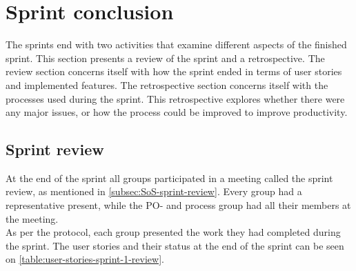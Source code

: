 \section{Sprint conclusion}
The sprints end with two activities that examine different aspects of the finished sprint.
This section presents a review of the sprint and a retrospective.
The review section concerns itself with how the sprint ended in terms of user stories and implemented features.
The retrospective section concerns itself with the processes used during the sprint.
This retrospective explores whether there were any major issues, or how the process could be improved to improve productivity.

\subsection{Sprint review}
At the end of the sprint all groups participated in a meeting called the sprint review, as mentioned in \autoref{subsec:SoS-sprint-review}.
Every group had a representative present, while the PO- and process group had all their members at the meeting.
\\
As per the protocol, each group presented the work they had completed during the sprint. The user stories and their status at the end of the sprint can be seen on \autoref{table:user-stories-sprint-1-review}.

